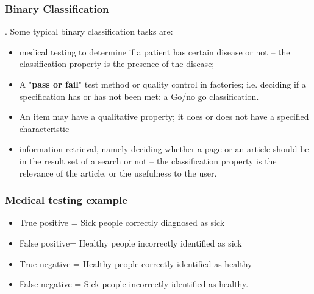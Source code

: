 \documentclass[a4]{beamer}
\begin{document}
\begin{frame}
	\frametitle{Binary Classification}
	\large
. Some typical binary classification tasks are:
\begin{itemize}
\item	medical testing to determine if a patient has certain disease or not – the classification property is the presence of the disease;
\item	A "\textbf{pass or fail}" test method or quality control in factories; i.e. deciding if a specification has or has not been met: a Go/no go classification.
\item 	An item may have a qualitative property; it does or does not have a specified characteristic
\item	information retrieval, namely deciding whether a page or an article should be in the result set of a search or not – the classification property is the relevance of the article, or the usefulness to the user.
\end{itemize}	


\end{frame}

\begin{frame}
	\frametitle{Medical testing example}
	\begin{itemize}
		\item True positive = Sick people correctly diagnosed as sick
		
		\item False positive= Healthy people incorrectly identified as sick
		
		\item True negative = Healthy people correctly identified as healthy
		
		\item False negative = Sick people incorrectly identified as healthy.
	\end{itemize}
\end{frame}
\end{document}

